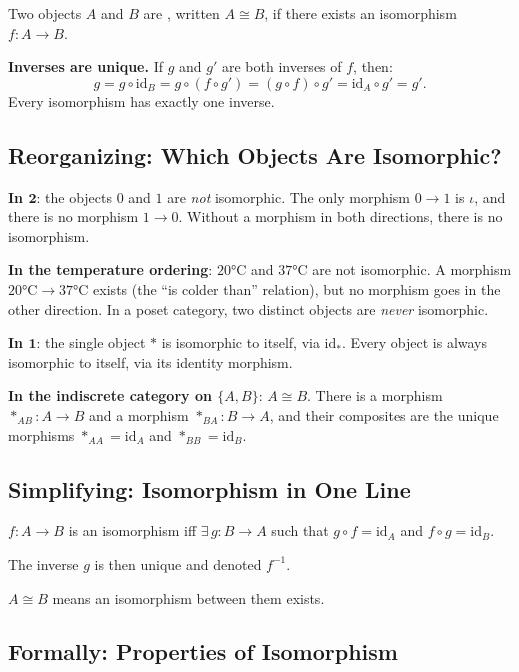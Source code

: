 Two objects $A$ and $B$ are , written $A \cong B$, if there
exists an isomorphism $f : A \to B$.

\textbf{Inverses are unique.} If $g$ and $g'$ are both inverses of $f$, then:
\[
  g = g \circ \mathrm{id}_B = g \circ (f \circ g') = (g \circ f) \circ g'
  = \mathrm{id}_A \circ g' = g'.
\]
Every isomorphism has exactly one inverse.

\subsection{Reorganizing: Which Objects Are Isomorphic?}

\textbf{In $\mathbf{2}$}: the objects $0$ and $1$ are \emph{not} isomorphic.
The only morphism $0 \to 1$ is $\iota$, and there is no morphism $1 \to 0$.
Without a morphism in both directions, there is no isomorphism.

\textbf{In the temperature ordering}: $20°\text{C}$ and $37°\text{C}$ are
not isomorphic. A morphism $20°\text{C} \to 37°\text{C}$ exists (the
``is colder than'' relation), but no morphism goes in the other direction.
In a poset category, two distinct objects are \emph{never} isomorphic.

\textbf{In $\mathbf{1}$}: the single object $*$ is isomorphic to itself,
via $\mathrm{id}_*$. Every object is always isomorphic to itself, via its
identity morphism.

\textbf{In the indiscrete category on $\{A, B\}$}: $A \cong B$. There is a
morphism $*_{AB} : A \to B$ and a morphism $*_{BA} : B \to A$, and their
composites are the unique morphisms $*_{AA} = \mathrm{id}_A$ and
$*_{BB} = \mathrm{id}_B$.

\subsection{Simplifying: Isomorphism in One Line}

$f : A \to B$ is an isomorphism iff $\exists\, g : B \to A$ such that
$g \circ f = \mathrm{id}_A$ and $f \circ g = \mathrm{id}_B$.

The inverse $g$ is then unique and denoted $f^{-1}$.

$A \cong B$ means an isomorphism between them exists.

\subsection{Formally: Properties of Isomorphism}

